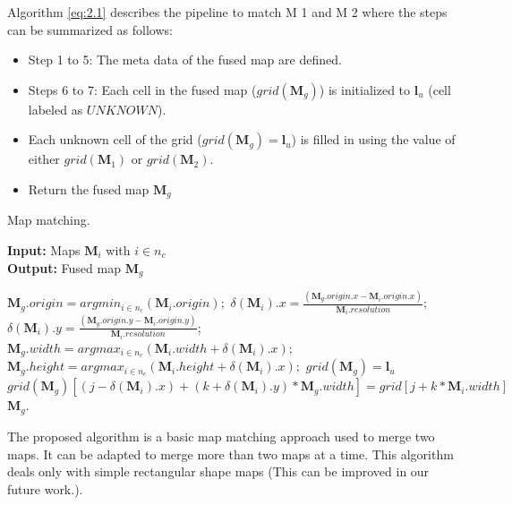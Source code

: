 Algorithm \ref{eq:2.1} describes the pipeline to match M 1 and M 2 where the steps can be summarized as follows:
\begin{itemize}
    \item Step 1 to 5: The meta data of the fused map are deﬁned.
    \item Steps 6 to 7: Each cell in the fused map ($grid(\mathbf{M}_g)$) is initialized to $\mathbf{l}_u$ (cell labeled as $U N K N O W N $).
    \item Each unknown cell of the grid ($grid(\mathbf{M}_g)=\mathbf{l}_u$) is filled in using the value of either $grid(\mathbf{M}_1)$ or $grid(\mathbf{M}_2)$.
    \item Return the fused map $\mathbf{M}_g$
\end{itemize}
\begin{algorithm}
    \caption{Map matching.}
    \hspace*{\algorithmicindent} \textbf{Input:} Maps $\mathbf{M}_i$ with $i \in n_c$ \\
    \hspace*{\algorithmicindent} \textbf{Output:} Fused map $\mathbf{M}_g$
    \begin{algorithmic}[1]
        \STATE $\mathbf{M}_g.origin=argmin_{i \in n_c}(\mathbf{M}_i.origin);$
        \STATE $\delta(\mathbf{M}_i).x=\frac{(\mathbf{M}_g.origin.x-\mathbf{M}_i.origin.x)}{\mathbf{M}_i.resolution};$
        \STATE $\delta(\mathbf{M}_i).y=\frac{(\mathbf{M}_g.origin.y-\mathbf{M}_i.origin.y)}{\mathbf{M}_i.resolution};$
        \STATE $\mathbf{M}_g.width=argmax_{i \in n_c}(\mathbf{M}_i.width + \delta(\mathbf{M}_i).x);$
        \STATE $\mathbf{M}_g.height=argmax_{i \in n_c}(\mathbf{M}_i.height + \delta(\mathbf{M}_i).x);$
        \STATE $grid(\mathbf{M}_g)=\mathbf{l}_u$
        \STATE $grid(\mathbf{M}_g)\left[ (j-\delta(\mathbf{M}_i).x)+(k+\delta(\mathbf{M}_i).y)*\mathbf{M}_g.width \right]=grid\left[ j+k*\mathbf{M}_i.width \right]$
        \ENDIF
        \ENDFOR
        \ENDFOR
        \ENDFOR
        \ENDFOR
        \RETURN $\mathbf{M}_g.$
    \end{algorithmic}
\end{algorithm}
The proposed algorithm is a basic map matching approach used to merge two maps. It can be adapted to merge more than two maps at a time. This algorithm deals only with simple rectangular shape maps (This can be improved in our future work.).
